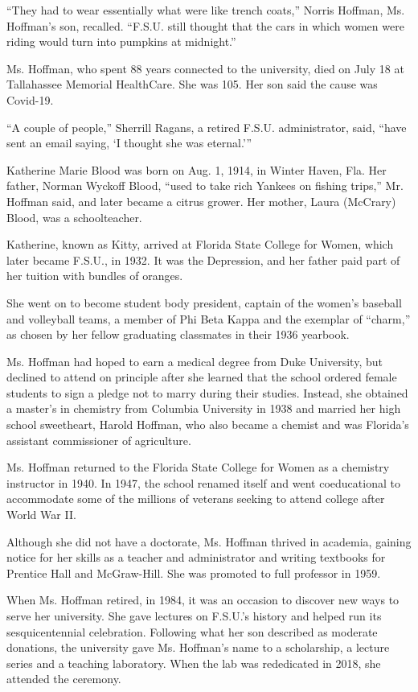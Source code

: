 ``They had to wear essentially what were like trench coats,'' Norris
Hoffman, Ms. Hoffman's son, recalled. ``F.S.U. still thought that the
cars in which women were riding would turn into pumpkins at midnight.''

Ms. Hoffman, who spent 88 years connected to the university, died on
July 18 at Tallahassee Memorial HealthCare. She was 105. Her son said
the cause was Covid-19.

``A couple of people,'' Sherrill Ragans, a retired F.S.U. administrator,
said, ``have sent an email saying, `I thought she was eternal.'''

Katherine Marie Blood was born on Aug. 1, 1914, in Winter Haven, Fla.
Her father, Norman Wyckoff Blood, ``used to take rich Yankees on fishing
trips,'' Mr. Hoffman said, and later became a citrus grower. Her mother,
Laura (McCrary) Blood, was a schoolteacher.

Katherine, known as Kitty, arrived at Florida State College for Women,
which later became F.S.U., in 1932. It was the Depression, and her
father paid part of her tuition with bundles of oranges.

She went on to become student body president, captain of the women's
baseball and volleyball teams, a member of Phi Beta Kappa and the
exemplar of ``charm,'' as chosen by her fellow graduating classmates in
their 1936 yearbook.

Ms. Hoffman had hoped to earn a medical degree from Duke University, but
declined to attend on principle after she learned that the school
ordered female students to sign a pledge not to marry during their
studies. Instead, she obtained a master's in chemistry from Columbia
University in 1938 and married her high school sweetheart, Harold
Hoffman, who also became a chemist and was Florida's assistant
commissioner of agriculture.

Ms. Hoffman returned to the Florida State College for Women as a
chemistry instructor in 1940. In 1947, the school renamed itself and
went coeducational to accommodate some of the millions of veterans
seeking to attend college after World War II.

Although she did not have a doctorate, Ms. Hoffman thrived in academia,
gaining notice for her skills as a teacher and administrator and writing
textbooks for Prentice Hall and McGraw-Hill. She was promoted to full
professor in 1959.

When Ms. Hoffman retired, in 1984, it was an occasion to discover new
ways to serve her university. She gave lectures on F.S.U.'s history and
helped run its sesquicentennial celebration. Following what her son
described as moderate donations, the university gave Ms. Hoffman's name
to a scholarship, a lecture series and a teaching laboratory. When the
lab was rededicated in 2018, she attended the ceremony.

